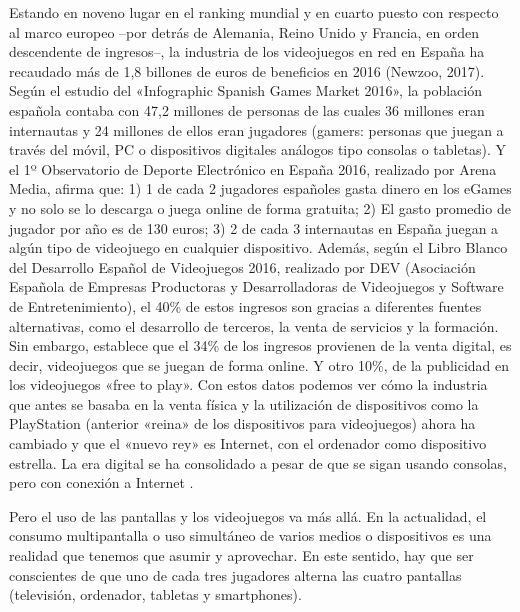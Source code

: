 \documentclass[a4paper,11pt]{article}
\begin{document}
Estando en noveno lugar en el ranking mundial y en cuarto puesto con respecto al marco europeo –por detrás de Alemania, Reino Unido y Francia, en orden descendente de ingresos–, la industria de los videojuegos en red en España ha recaudado más de 1,8 billones de euros de beneficios en 2016 (Newzoo, 2017). Según el estudio del
«Infographic Spanish Games Market 2016», la población española contaba con 47,2 millones de personas de las cuales 36 millones eran internautas y 24 millones de ellos eran jugadores (gamers: personas que juegan a través del móvil, PC o dispositivos digitales análogos tipo consolas o tabletas). Y el 1º Observatorio de Deporte Electrónico en España 2016, realizado por Arena Media, afirma que: 1) 1 de cada 2 jugadores españoles gasta dinero en los eGames y no solo se lo descarga o juega online de forma gratuita; 2) El gasto promedio de jugador por año es de 130 euros;
3) 2 de cada 3 internautas en España juegan a algún tipo de videojuego en cualquier dispositivo.
Además, según el Libro Blanco del Desarrollo Español de Videojuegos 2016, realizado por DEV (Asociación Española de Empresas Productoras y Desarrolladoras de Videojuegos y Software de Entretenimiento), el 40\% de estos ingresos son gracias a diferentes fuentes alternativas, como el desarrollo de terceros, la venta de servicios y la formación. Sin embargo, establece que el 34\% de los ingresos provienen de la venta digital, es decir, videojuegos que se juegan de forma online. Y otro 10\%, de la publicidad en los videojuegos «free to play». Con estos datos podemos ver cómo la industria que antes se basaba en la venta física y la utilización de dispositivos como la PlayStation (anterior «reina» de los dispositivos para videojuegos) ahora ha cambiado y que el «nuevo rey» es Internet, con el ordenador como dispositivo estrella. La era digital se ha consolidado a pesar de que se sigan usando consolas, pero con conexión a Internet  \cite{Erik2015}.

Pero el uso de las pantallas y los videojuegos va más allá. En la actualidad, el consumo multipantalla o uso simultáneo de varios medios o dispositivos es una realidad que tenemos que asumir y aprovechar. En este sentido, hay que ser conscientes de que uno de cada tres jugadores alterna las cuatro pantallas (televisión, ordenador, tabletas y smartphones)\cite{Pedrycz2016}.
\end{document}
